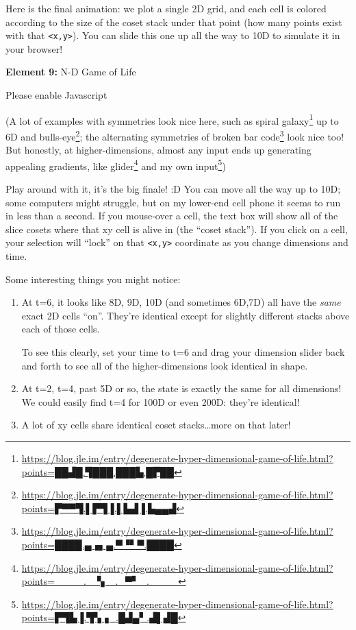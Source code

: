 \documentclass[]{article}
\renewcommand{\href}[2]{#2\footnote{\url{#1}}}
\begin{document}
Here is the final animation: we plot a single 2D grid, and each cell is colored
according to the size of the coset stack under that point (how many points exist
with that \texttt{\textless{}x,y\textgreater{}}). You can slide this one up all
the way to 10D to simulate it in your browser!

\leavevmode\hypertarget{golFlat}{}%
\textbf{Element 9:} N-D Game of Life

\leavevmode\hypertarget{golFlatCont}{}%
Please enable Javascript

(A lot of examples with symmetries look nice here, such as
\href{https://blog.jle.im/entry/degenerate-hyper-dimensional-game-of-life.html?points=██▟█.▜███.███▙.█▛██}{spiral
galaxy} up to 6D and
\href{https://blog.jle.im/entry/degenerate-hyper-dimensional-game-of-life.html?points=▛▀▀▜.▌▛▜▐.▌▙▟▐.▙▄▄▟}{bulls-eye};
the alternating symmetries of
\href{https://blog.jle.im/entry/degenerate-hyper-dimensional-game-of-life.html?points=████.▄▗▖▄.▀▝▘▀.████}{broken
bar code} look nice too! But honestly, at higher-dimensions, almost any input
ends up generating appealing gradients, like
\href{https://blog.jle.im/entry/degenerate-hyper-dimensional-game-of-life.html?points=____._▝▖_._▀▘_.____}{glider}
and
\href{https://blog.jle.im/entry/degenerate-hyper-dimensional-game-of-life.html?points=▛▜▙▐.▜▚▗_.█▟▄▘.▟▌▟█}{my
own input})

Play around with it, it's the big finale! :D You can move all the way up to 10D;
some computers might struggle, but on my lower-end cell phone it seems to run in
less than a second. If you mouse-over a cell, the text box will show all of the
slice cosets where that xy cell is alive in (the ``coset stack''). If you click
on a cell, your selection will ``lock'' on that
\texttt{\textless{}x,y\textgreater{}} coordinate as you change dimensions and
time.

Some interesting things you might notice:

\begin{enumerate}
\def\labelenumi{\arabic{enumi}.}
\item
  At t=6, it looks like 8D, 9D, 10D (and sometimes 6D,7D) all have the
  \emph{same} exact 2D cells ``on''. They're identical except for slightly
  different stacks above each of those cells.

  To see this clearly, set your time to t=6 and drag your dimension slider back
  and forth to see all of the higher-dimensions look identical in shape.
\item
  At t=2, t=4, past 5D or so, the state is exactly the same for all dimensions!
  We could easily find t=4 for 100D or even 200D: they're identical!
\item
  A lot of xy cells share identical coset stacks\ldots more on that later!
\end{enumerate}
\end{document}

